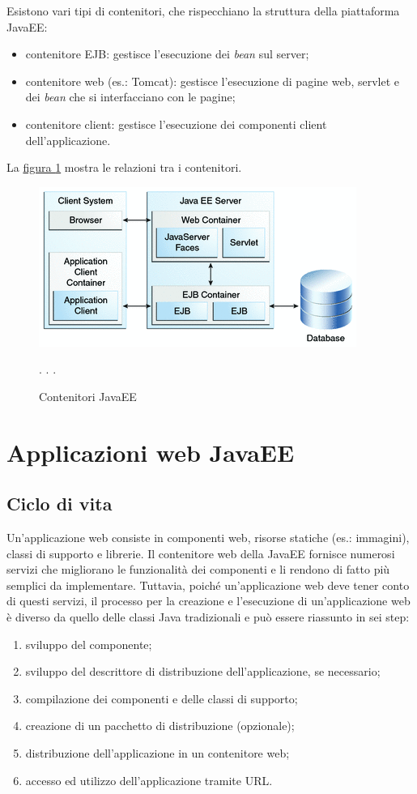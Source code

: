 Esistono vari tipi di contenitori, che rispecchiano la struttura della piattaforma JavaEE:
\begin{itemize}
	\item contenitore EJB: gestisce l'esecuzione dei \textit{bean} sul server;
	\item contenitore web (es.: Tomcat): gestisce l'esecuzione di pagine web, servlet e dei \textit{bean} che si interfacciano con le pagine;
	\item contenitore client: gestisce l'esecuzione dei componenti client dell'applicazione.
\end{itemize}
La \hyperref[fig:javaee-contenitori]{figura \ref{fig:javaee-contenitori}} mostra le relazioni tra i contenitori.
\begin{figure}
	\centering
	\includegraphics{Immagini/javaee-contenitori.png}
	\caption{Contenitori JavaEE}
	\label{fig:javaee-contenitori}
	\footnotesize{}. \citeauthor{bib:javaee-tutorial}. \citeyear{bib:javaee-tutorial}.
\end{figure}

\section{Applicazioni web JavaEE}
\subsection{Ciclo di vita}
Un'applicazione web consiste in componenti web, risorse statiche (es.: immagini), classi di supporto e librerie. Il contenitore web della JavaEE fornisce numerosi servizi che migliorano le funzionalità dei componenti e li rendono di fatto più semplici da implementare. Tuttavia, poiché un'applicazione web deve tener conto di questi servizi, il processo per la creazione e l'esecuzione di un'applicazione web è diverso da quello delle classi Java tradizionali e può essere riassunto in sei step:
\begin{enumerate}
	\item sviluppo del componente;
	\item sviluppo del \gls{descrittore di distribuzione} dell'applicazione, se necessario;
	\item compilazione dei componenti e delle classi di supporto;
	\item creazione di un pacchetto di distribuzione (opzionale);
	\item distribuzione dell'applicazione in un contenitore web;
	\item accesso ed utilizzo dell'applicazione tramite \Gls{URL}.
\end{enumerate}

